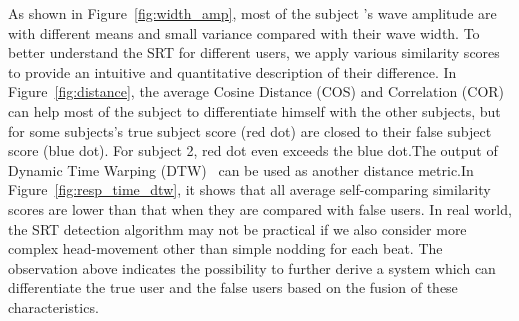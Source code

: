 As shown in Figure~\ref{fig:width_amp}, most of the subject ’s wave amplitude are with different means and small variance compared with their wave width.  To better understand the SRT for different users,  we apply various similarity scores to provide an intuitive and quantitative description of their difference. In Figure~\ref{fig:distance}, the average Cosine Distance (COS) and Correlation (COR) can help most of the subject to differentiate himself with the other subjects, but for some subjects's true subject score (red dot) are closed to their false subject score (blue dot). For subject 2, red dot even exceeds the blue dot.The output of Dynamic Time Warping (DTW)~\cite{cite dtw} can be used as another distance metric.In Figure~\ref{fig:resp_time_dtw},  it shows that all average self-comparing similarity scores are lower than that when they are compared with false users. In real world, the SRT detection algorithm may not be practical if we also consider more complex head-movement other than simple nodding for each beat. The observation above indicates the possibility to further derive a system which can differentiate the true user and the false users based on the fusion of these characteristics.